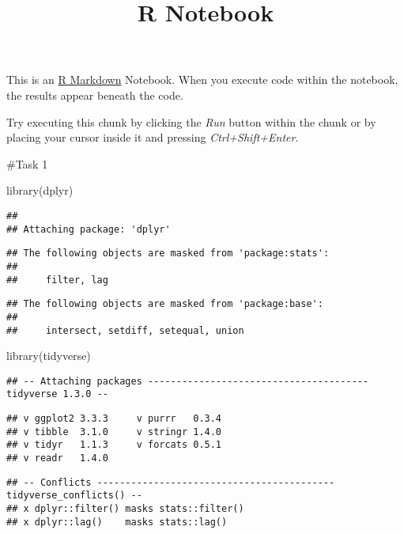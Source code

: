 \documentclass[
]{article}
\title{R Notebook}
\author{}
\date{\vspace{-2.5em}}
\newenvironment{Shaded}{\begin{snugshade}}{\end{snugshade}}
\newcommand{\FunctionTok}[1]{\textcolor[rgb]{0.00,0.00,0.00}{#1}}
\newcommand{\NormalTok}[1]{#1}
\begin{document}
\maketitle

This is an \href{http://rmarkdown.rstudio.com}{R Markdown} Notebook.
When you execute code within the notebook, the results appear beneath
the code.

Try executing this chunk by clicking the \emph{Run} button within the
chunk or by placing your cursor inside it and pressing
\emph{Ctrl+Shift+Enter}.

\#Task 1

\begin{Shaded}
\begin{Highlighting}[]
\FunctionTok{library}\NormalTok{(dplyr)}
\end{Highlighting}
\end{Shaded}

\begin{verbatim}
## 
## Attaching package: 'dplyr'
\end{verbatim}

\begin{verbatim}
## The following objects are masked from 'package:stats':
## 
##     filter, lag
\end{verbatim}

\begin{verbatim}
## The following objects are masked from 'package:base':
## 
##     intersect, setdiff, setequal, union
\end{verbatim}

\begin{Shaded}
\begin{Highlighting}[]
\FunctionTok{library}\NormalTok{(tidyverse)}
\end{Highlighting}
\end{Shaded}

\begin{verbatim}
## -- Attaching packages --------------------------------------- tidyverse 1.3.0 --
\end{verbatim}

\begin{verbatim}
## v ggplot2 3.3.3     v purrr   0.3.4
## v tibble  3.1.0     v stringr 1.4.0
## v tidyr   1.1.3     v forcats 0.5.1
## v readr   1.4.0
\end{verbatim}

\begin{verbatim}
## -- Conflicts ------------------------------------------ tidyverse_conflicts() --
## x dplyr::filter() masks stats::filter()
## x dplyr::lag()    masks stats::lag()
\end{verbatim}
\end{document}
